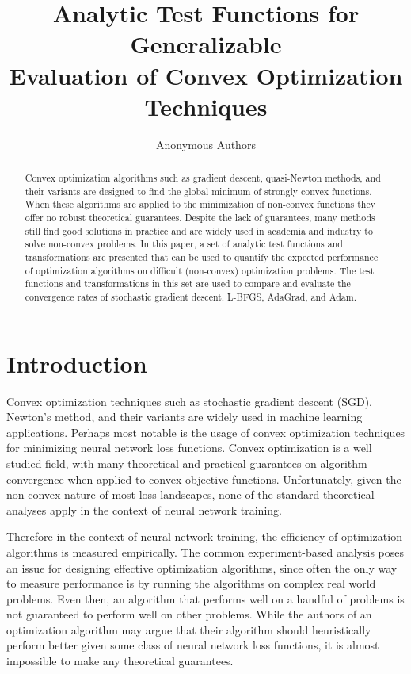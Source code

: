\documentclass[conference]{ieeeconf}  %
\title{\LARGE \bf Analytic Test Functions for Generalizable
  \\ Evaluation of Convex Optimization Techniques}
\author{Anonymous Authors}
\begin{document}
\maketitle
\thispagestyle{empty}
\pagestyle{empty}

\begin{abstract}

Convex optimization algorithms such as gradient descent, quasi-Newton
methods, and their variants are designed to find the global minimum of
strongly convex functions. When these algorithms are applied to the
minimization of non-convex functions they offer no robust theoretical
guarantees. Despite the lack of guarantees, many methods still find
good solutions in practice and are widely used in academia and
industry to solve non-convex problems. In this paper, a set of
analytic test functions and transformations are presented that can be
used to quantify the expected performance of optimization algorithms
on difficult (non-convex) optimization problems. The test functions
and transformations in this set are used to compare and evaluate the
convergence rates of stochastic gradient descent, L-BFGS, AdaGrad, and
Adam.

\end{abstract}

\section{Introduction}
\label{sec:introduction}

Convex optimization techniques such as stochastic gradient descent
(SGD), Newton's method, and their variants are widely used in machine
learning applications.  Perhaps most notable is the usage of convex
optimization techniques for minimizing neural network loss functions.
Convex optimization is a well studied field, with many theoretical and
practical guarantees on algorithm convergence when applied to convex
objective functions.  Unfortunately, given the non-convex nature of
most loss landscapes, none of the standard theoretical analyses apply
in the context of neural network training.

Therefore in the context of neural network training, the efficiency of
optimization algorithms is measured empirically.  The common
experiment-based analysis poses an issue for designing effective
optimization algorithms, since often the only way to measure
performance is by running the algorithms on complex real world
problems. Even then, an algorithm that performs well on a handful of
problems is not guaranteed to perform well on other problems.  While
the authors of an optimization algorithm may argue that their
algorithm should heuristically perform better given some class of
neural network loss functions, it is almost impossible to make any
theoretical guarantees.
\end{document}

